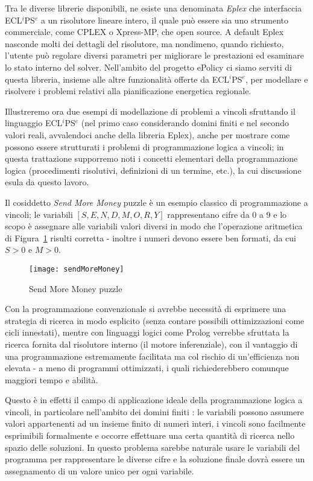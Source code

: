 Tra le diverse librerie disponibili, ne esiste una denominata \emph{Eplex} \cite{eplex} che interfaccia ECL$^i$PS$^e$ a un risolutore lineare intero, il quale può essere sia uno strumento commerciale, come CPLEX o Xpress-MP, che open source. A default Eplex nasconde molti dei dettagli del risolutore, ma nondimeno, quando richiesto, l'utente può regolare diversi parametri per migliorare le prestazioni ed esaminare lo stato interno del solver. Nell'ambito del progetto ePolicy ci siamo serviti di questa libreria, insieme alle altre funzionalità offerte da ECL$^i$PS$^e$, per modellare e risolvere i problemi relativi alla pianificazione energetica regionale.

Illustreremo ora due esempi di modellazione di problemi a vincoli sfruttando il linguaggio ECL$^i$PS$^e$ (nel primo caso considerando domini finiti e nel secondo valori reali, avvalendoci anche della libreria Eplex), anche per mostrare come possono essere strutturati i problemi di programmazione logica a vincoli; in questa trattazione supporremo noti i concetti elementari della programmazione logica (procedimenti risolutivi, definizioni di un termine, etc.), la cui discussione esula da questo lavoro.

Il cosiddetto \emph{Send More Money} puzzle è un esempio classico di programmazione a vincoli; le variabili $[S,E,N,D,M,O,R,Y]$ rappresentano cifre da 0 a 9 e lo scopo è assegnare alle variabili valori diversi in modo che l'operazione aritmetica di Figura~\ref{SendMoreMoney} risulti corretta - inoltre i numeri devono essere ben formati, da cui $S>0$ e $M>0$. 

\begin{figure}[h]
	\centering
	\texttt{[image: sendMoreMoney]}
	\caption{Send More Money puzzle}
	\label{SendMoreMoney}
\end{figure}

Con la programmazione convenzionale si avrebbe necessità di esprimere una strategia di ricerca in modo esplicito (senza contare possibili ottimizzazioni come cicli innestati), mentre con linguaggi logici come Prolog verrebbe sfruttata la ricerca fornita dal risolutore interno (il motore inferenziale), con il vantaggio di una programmazione estremamente facilitata ma col rischio di un'efficienza non elevata - a meno di programmi ottimizzati, i quali richiederebbero comunque maggiori tempo e abilità. 

Questo è in effetti il campo di applicazione ideale della programmazione logica a vincoli, in particolare nell'ambito  dei domini finiti \clpfd: le variabili possono assumere valori appartenenti ad un insieme finito di numeri interi, i vincoli sono facilmente esprimibili formalmente e occorre effettuare una certa quantità di ricerca nello spazio delle soluzioni. In questo problema sarebbe naturale usare le variabili del programma per rappresentare le diverse cifre e la soluzione finale dovrà essere un assegnamento di un valore unico per ogni variabile. 

